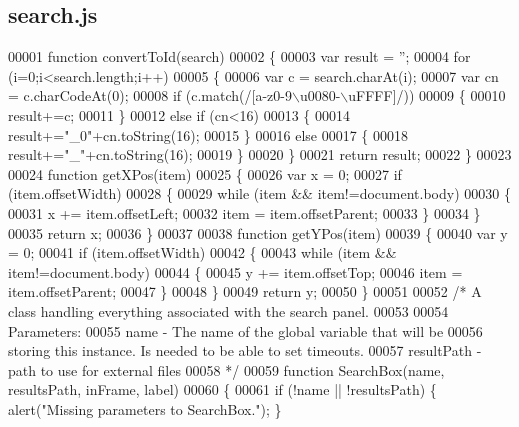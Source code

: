 \subsection{search.\+js}
\label{search_8js_source}

\begin{DoxyCode}
00001 \textcolor{keyword}{function} convertToId(search)
00002 \{
00003   var result = \textcolor{stringliteral}{''};
00004   \textcolor{keywordflow}{for} (i=0;i<search.length;i++)
00005   \{
00006     var c = search.charAt(i);
00007     var cn = c.charCodeAt(0);
00008     \textcolor{keywordflow}{if} (c.match(/[a-z0-9\(\backslash\)u0080-\(\backslash\)uFFFF]/))
00009     \{
00010       result+=c;
00011     \}
00012     \textcolor{keywordflow}{else} \textcolor{keywordflow}{if} (cn<16)
00013     \{
00014       result+=\textcolor{stringliteral}{"\_0"}+cn.toString(16);
00015     \}
00016     \textcolor{keywordflow}{else}
00017     \{
00018       result+=\textcolor{stringliteral}{"\_"}+cn.toString(16);
00019     \}
00020   \}
00021   \textcolor{keywordflow}{return} result;
00022 \}
00023 
00024 \textcolor{keyword}{function} getXPos(item)
00025 \{
00026   var x = 0;
00027   \textcolor{keywordflow}{if} (item.offsetWidth)
00028   \{
00029     \textcolor{keywordflow}{while} (item && item!=document.body)
00030     \{
00031       x   += item.offsetLeft;
00032       item = item.offsetParent;
00033     \}
00034   \}
00035   \textcolor{keywordflow}{return} x;
00036 \}
00037 
00038 \textcolor{keyword}{function} getYPos(item)
00039 \{
00040   var y = 0;
00041   \textcolor{keywordflow}{if} (item.offsetWidth)
00042   \{
00043      \textcolor{keywordflow}{while} (item && item!=document.body)
00044      \{
00045        y   += item.offsetTop;
00046        item = item.offsetParent;
00047      \}
00048   \}
00049   \textcolor{keywordflow}{return} y;
00050 \}
00051 
00052 \textcolor{comment}{/* A class handling everything associated with the search panel.}
00053 \textcolor{comment}{}
00054 \textcolor{comment}{   Parameters:}
00055 \textcolor{comment}{   name - The name of the global variable that will be}
00056 \textcolor{comment}{          storing this instance.  Is needed to be able to set timeouts.}
00057 \textcolor{comment}{   resultPath - path to use for external files}
00058 \textcolor{comment}{*/}
00059 \textcolor{keyword}{function} SearchBox(name, resultsPath, inFrame, label)
00060 \{
00061   \textcolor{keywordflow}{if} (!name || !resultsPath) \{  alert(\textcolor{stringliteral}{"Missing parameters to SearchBox."}); \}

\end{DoxyCode}
